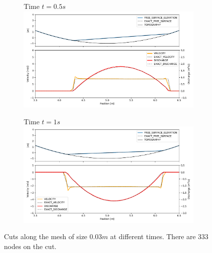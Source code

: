 \documentclass[a4paper,12pt]{article}
\begin{document}
\begin{figure}[H]
\begin{subfigure}{\textwidth}
    \centering
    Time $t=0.5s$
    \includegraphics[width=\textwidth]{img/par/parabola_t0.5.pdf}
\end{subfigure}
\par\medskip
\begin{subfigure}{\textwidth}
    \centering
    Time $t=1s$
    \includegraphics[width=\textwidth]{img/par/parabola_t1.0.pdf}
\end{subfigure}
\caption{Cuts along the mesh of size $0.03m$ at different times. There are 333 nodes on the cut.}
\label{parabola_graphic}
\end{figure}
\end{document}
